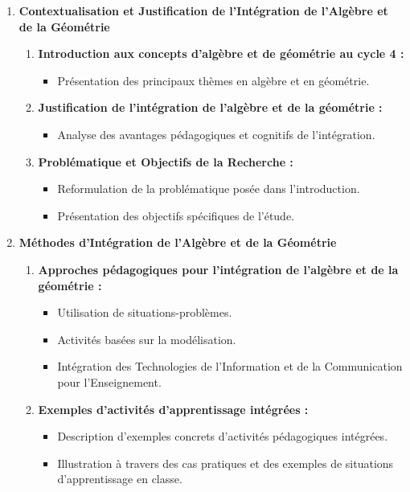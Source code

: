 \begin{enumerate}
    \item \textbf{Contextualisation et Justification de l'Intégration de l'Algèbre et de la Géométrie}
    \begin{enumerate}
        \item \textbf{Introduction aux concepts d'algèbre et de géométrie au cycle 4 :}
        \begin{itemize}
            \item Présentation des principaux thèmes en algèbre et en géométrie.
        \end{itemize}
        
        \item \textbf{Justification de l'intégration de l'algèbre et de la géométrie :}
        \begin{itemize}
            \item Analyse des avantages pédagogiques et cognitifs de l'intégration.
        \end{itemize}
        
        \item \textbf{Problématique et Objectifs de la Recherche :}
        \begin{itemize}
            \item Reformulation de la problématique posée dans l'introduction.
            \item Présentation des objectifs spécifiques de l'étude.
        \end{itemize}
    \end{enumerate}
    
    \item \textbf{Méthodes d'Intégration de l'Algèbre et de la Géométrie}
    \begin{enumerate}
        \item \textbf{Approches pédagogiques pour l'intégration de l'algèbre et de la géométrie :}
        \begin{itemize}
            \item Utilisation de situations-problèmes.
            \item Activités basées sur la modélisation.
            \item Intégration des Technologies de l'Information et de la Communication pour l'Enseignement.
        \end{itemize}
        
        \item \textbf{Exemples d'activités d'apprentissage intégrées :}
        \begin{itemize}
            \item Description d'exemples concrets d'activités pédagogiques intégrées.
            \item Illustration à travers des cas pratiques et des exemples de situations d'apprentissage en classe.
        \end{itemize}
    \end{enumerate}
    

\end{enumerate}
